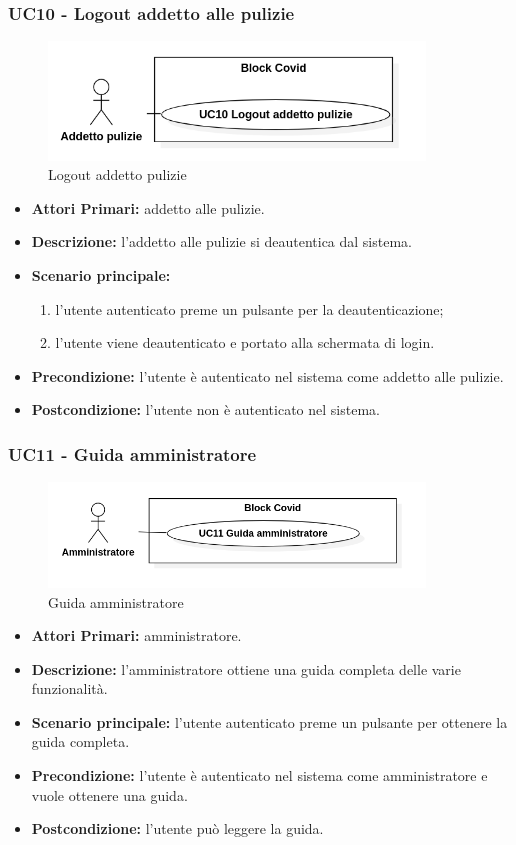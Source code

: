 \subsubsection{ UC10 - Logout addetto alle pulizie}
\begin{figure}[H]
	\centering
	\includegraphics[width=10cm]{res/images/UC10.png}
	\caption{Logout addetto pulizie}
\end{figure}
\begin{itemize}
	\item\textbf{Attori Primari:} 
	addetto alle pulizie.
	\item\textbf{Descrizione:} 
	l'addetto alle pulizie si deautentica dal sistema.
	\item\textbf{Scenario principale:} 
	\begin{enumerate}
		\item l'utente autenticato preme un pulsante per la deautenticazione;
		\item l'utente viene deautenticato e portato alla schermata di login.
	\end{enumerate}
	\item\textbf{Precondizione:} 
	l'utente è autenticato nel sistema come addetto alle pulizie.
	\item\textbf{Postcondizione:}
	l'utente non è autenticato nel sistema.
\end{itemize}

\subsubsection{ UC11 - Guida amministratore}
\begin{figure}[H]
	\centering
	\includegraphics[width=10cm]{res/images/UC11.png}
	\caption{Guida amministratore}
\end{figure}
\begin{itemize}
	\item\textbf{Attori Primari:} 
	amministratore.
	\item\textbf{Descrizione:} 
	l'amministratore ottiene una guida completa delle varie funzionalità.
	\item\textbf{Scenario principale:} 
	l'utente autenticato preme un pulsante per ottenere la guida completa.
	\item\textbf{Precondizione:} 
	l'utente è autenticato nel sistema come amministratore e vuole ottenere una guida.
	\item\textbf{Postcondizione:}
	l'utente può leggere la guida.
\end{itemize}

